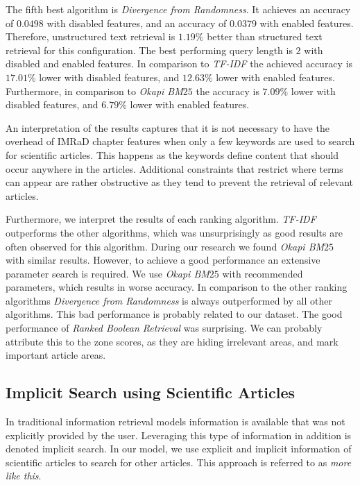 The fifth best algorithm is \textit{Divergence from Randomness}. It achieves an accuracy of $0.0498$ with disabled features, and an accuracy of $0.0379$ with enabled features. Therefore, unstructured text retrieval is $1.19 \%$ better than structured text retrieval for this configuration. The best performing query length is $2$ with disabled and enabled features. In comparison to \textit{TF-IDF} the achieved accuracy is $17.01 \%$ lower with disabled features, and $12.63 \%$ lower with enabled features. Furthermore, in comparison to \textit{Okapi BM$25$} the accuracy is $7.09 \%$ lower with disabled features, and $6.79 \%$ lower with enabled features.

An interpretation of the results captures that it is not necessary to have the overhead of IMRaD chapter features when only a few keywords are used to search for scientific articles. This happens as the keywords define content that should occur anywhere in the articles. Additional constraints that restrict where terms can appear are rather obstructive as they tend to prevent the retrieval of relevant articles.

Furthermore, we interpret the results of each ranking algorithm. \textit{TF-IDF} outperforms the other algorithms, which was unsurprisingly as good results are often observed for this algorithm. During our research we found \textit{Okapi BM$25$} with similar results. However, to achieve a good performance an extensive parameter search is required. We use \textit{Okapi BM$25$} with recommended parameters, which results in worse accuracy. In comparison to the other ranking algorithms \textit{Divergence from Randomness} is always outperformed by all other algorithms. This bad performance is probably related to our dataset. The good performance of \textit{Ranked Boolean Retrieval} was surprising. We can probably attribute this to the zone scores, as they are hiding irrelevant areas, and mark important article areas.


\subsection{Implicit Search using Scientific Articles}
\label{sec:implicit_search_results}

In traditional information retrieval models information is available that was not explicitly provided by the user. Leveraging this type of information in addition is denoted implicit search. In our model, we use explicit and implicit information of scientific articles to search for other articles. This approach is referred to as \textit{more like this}.

